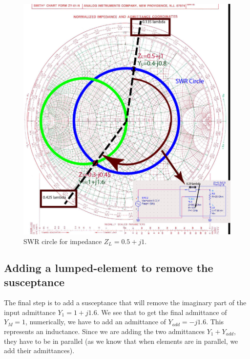 \documentclass{ximera}
\begin{document}
\begin{figure}[htbp]
\begin{center}
\includegraphics[scale=1]{../jpg/MixedMatch4-01.jpg}
\end{center}
\caption{SWR circle for impedance $Z_L=0.5+j1$.  }
\label{fig:SWRfor25Ohm}
\end{figure}

\subsection{Adding a lumped-element to remove the susceptance}


The final step is to add a susceptance that will remove the imaginary part of the input admittance $Y_1=1+j 1.6$. We see that to get the final admittance of $Y_M=1$, numerically, we have to add an admittance of $Y_{add}=-j1.6$. This represents an inductance. Since we are adding the two admittances $Y_1+Y_{add}$, they have to be in parallel (as we know that when elements are in parallel, we add their admittances).
\end{document}

